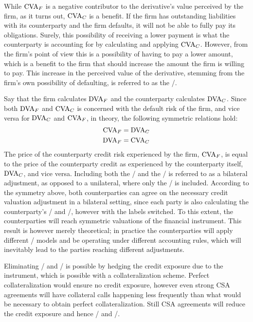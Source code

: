 \documentclass[main.tex]{subfiles}
\begin{document}
        While $\CVA/_{F}$ is a negative contributor to the derivative's value perceived by the firm, 
        as it turns out, $\CVA/_{C}$ is a benefit.
        If the firm has outstanding liabilities with its counterparty
        and the firm defaults, it will not be able to fully pay its obligations. 
        Surely, this possibility of receiving a lower payment is what the counterparty is accounting for 
        by calculating and applying $\CVA/_{C}$.
        However, from the firm's point of view this is a possibility of having to pay a lower amount,
        which is a benefit to the firm that should increase the amount the firm is willing to pay.
        This increase in the perceived value of the derivative, 
        stemming from the firm's own possibility of defaulting, 
        is referred to as the \DVA/.

        Say that the firm calculates $\DVA/_{F}$ and the counterparty calculates $\DVA/_{C}$.
        Since both $\DVA/_{F}$ and $\CVA/_{C}$ is concerned with the default risk of the firm,
        and vice versa for $\DVA/_{C}$ and $\CVA/_{F}$, in theory, the following symmetric relations hold:
            \begin{align*}
                \CVA/_{F} &= \DVA/_{C} \\
                \DVA/_{F} &= \CVA/_{C}
            \end{align*}
        The price of the counterparty credit risk experienced by the firm, $\CVA/_{F}$,
        is equal to the price of the counterparty credit as experienced by the counterparty itself, $\DVA/_{C}$,
        and vice versa.
        Including both the \CVA/ and the \DVA/ is referred to as a bilateral adjustment,
        as opposed to a unilateral, where only the \CVA/ is included.
        According to the symmetry above,
        both counterparties can agree on the necessary credit valuation adjustment in a bilateral setting,
        since each party is also calculating the counterparty's \CVA/ and \DVA/, however with the labels switched.
        To this extent, the counterparties will reach symmetric valuations of the financial instrument. 
        This result is however merely theoretical; 
        in practice the counterparties will apply different \CVA/ models
        and be operating under different accounting rules, 
        which will inevitably lead to the parties reaching different adjustments. 
        
        Eliminating \CVA/ and \DVA/ is possible by hedging the credit exposure due to the instrument,
        which is possible with a collateralization scheme. 
        Perfect collateralization would ensure no credit exposure,
        however even strong CSA agreements will have collateral calls happening less frequently
        than what would be necessary to obtain perfect collateralization.
        Still CSA agreements will reduce the credit exposure and hence \CVA/ and \DVA/.
\end{document}
